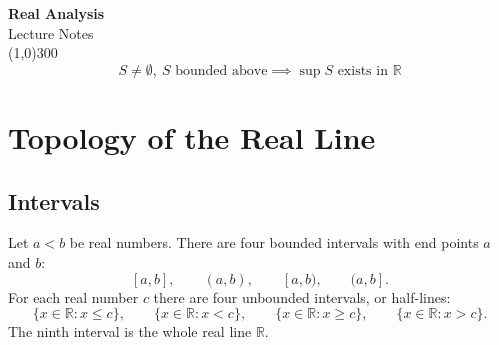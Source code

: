 \documentclass[11pt,a4paper]{article}
\numberwithin{equation}{section}
\theoremstyle{definition}
\begin{document}
\begin{titlepage}
\thispagestyle{empty}
\begin{center}
\vspace*{3cm}
{\Huge\bfseries Real Analysis}\\[1.2cm]
{\large Lecture Notes}\\[2.5cm]
\line(1,0){300}\\[1.5cm]
$$S\neq\emptyset,\ S \text{ bounded above} \implies \sup S \text{ exists in } \mathbb{R}$$
\end{center}
\end{titlepage}

\tableofcontents
\thispagestyle{empty}
\clearpage
\setcounter{page}{1}









\tableofcontents
\thispagestyle{empty}
\clearpage
\setcounter{page}{1}








\pagebreak
\section{Topology of the Real Line}


\subsection{Intervals}\label{sec:intervals}
Let $a<b$ be real numbers. There are four bounded intervals with end points $a$ and $b$:
$$[a,b],\qquad (a,b),\qquad [a,b),\qquad (a,b].$$
For each real number $c$ there are four unbounded intervals, or half-lines:
$$\{x \in \mathbb{R}: x \leq c\},\qquad \{x\in \mathbb{R}: x < c\},\qquad \{x\in \mathbb{R}: x\geq c\},\qquad \{x\in \mathbb{R}: x > c\}.$$
The ninth interval is the whole real line $\mathbb{R}$.

\begin{figure}[H]
\centering
{}
\end{figure}
\end{document}
